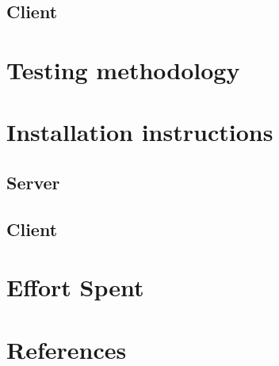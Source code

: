 	\section{Client}
\newpage
\chapter{Testing methodology}
\newpage
\chapter{Installation instructions}
	\section{Server}
		
	\section{Client}
\newpage
\chapter{Effort Spent}
    
\chapter{References}
	



